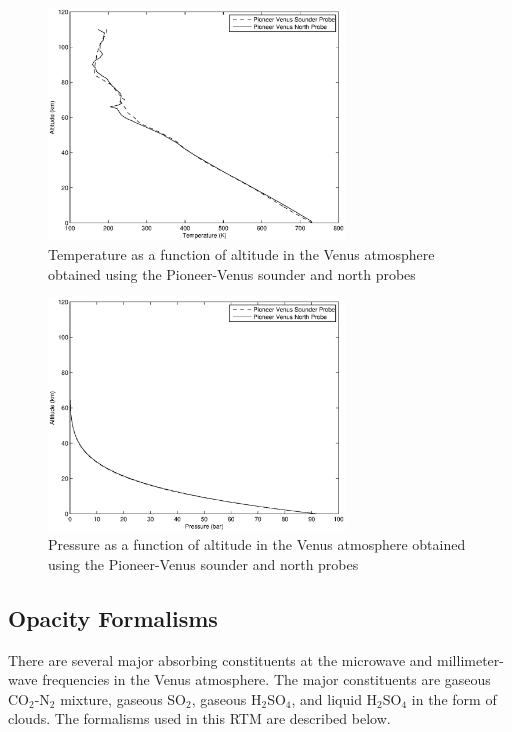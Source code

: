 \begin{figure}[p]
    \centering
	\includegraphics[width=0.7\textwidth]{./rtm/Plots/alt-temp.eps}
	\caption{Temperature as a function of altitude in the Venus atmosphere obtained using the Pioneer-Venus sounder and north probes }
		\label{fig:temp}
\end{figure}
\begin{figure}[p]
    \centering
	\includegraphics[width=0.7\textwidth]{./rtm/Plots/alt-pres.eps}
	\caption{Pressure as a function of altitude in the Venus atmosphere obtained using the Pioneer-Venus sounder and north probes }
		\label{fig:pres}
\end{figure}

\subsection{Opacity Formalisms}

There are several major absorbing constituents at the microwave and millimeter-wave frequencies in the Venus atmosphere. The major constituents are gaseous CO$_2$-N$_2$ mixture, gaseous SO$_2$, gaseous H$_2$SO$_4$, and liquid H$_2$SO$_4$ in the form of clouds. The formalisms used in this RTM are described below.
